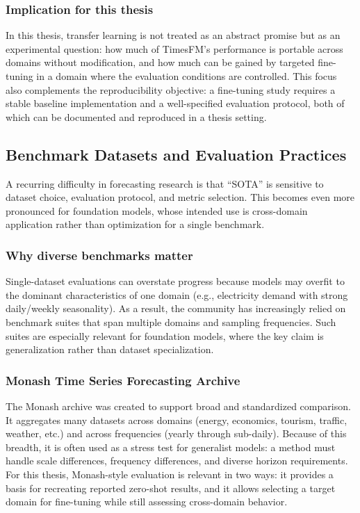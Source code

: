 \subsubsection{Implication for this thesis}
In this thesis, transfer learning is not treated as an abstract promise but as an experimental question: how much of TimesFM’s performance is portable across domains without modification, and how much can be gained by targeted fine-tuning in a domain where the evaluation conditions are controlled. This focus also complements the reproducibility objective: a fine-tuning study requires a stable baseline implementation and a well-specified evaluation protocol, both of which can be documented and reproduced in a thesis setting.

\subsection{Benchmark Datasets and Evaluation Practices}

A recurring difficulty in forecasting research is that ``SOTA'' is sensitive to dataset choice, evaluation protocol, and metric selection. This becomes even more pronounced for foundation models, whose intended use is cross-domain application rather than optimization for a single benchmark.

\subsubsection{Why diverse benchmarks matter}
Single-dataset evaluations can overstate progress because models may overfit to the dominant characteristics of one domain (e.g., electricity demand with strong daily/weekly seasonality). As a result, the community has increasingly relied on benchmark suites that span multiple domains and sampling frequencies. Such suites are especially relevant for foundation models, where the key claim is generalization rather than dataset specialization.

\subsubsection{Monash Time Series Forecasting Archive}
The Monash archive was created to support broad and standardized comparison. It aggregates many datasets across domains (energy, economics, tourism, traffic, weather, etc.) and across frequencies (yearly through sub-daily). Because of this breadth, it is often used as a stress test for generalist models: a method must handle scale differences, frequency differences, and diverse horizon requirements. For this thesis, Monash-style evaluation is relevant in two ways: it provides a basis for recreating reported zero-shot results, and it allows selecting a target domain for fine-tuning while still assessing cross-domain behavior.

